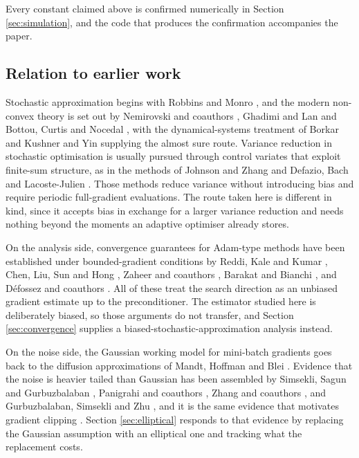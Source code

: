 \documentclass[pdflatex,sn-mathphys-num]{sn-jnl}%
\theoremstyle{thmstyleone}%
\theoremstyle{thmstyletwo}%
\theoremstyle{thmstylethree}%
\begin{document}
Every constant claimed above is confirmed numerically in Section \ref{sec:simulation}, and the code that produces the confirmation accompanies the paper.

\subsection{Relation to earlier work}

Stochastic approximation begins with Robbins and Monro \cite{robbins1951}, and the modern non-convex theory is set out by Nemirovski and coauthors \cite{nemirovski2009}, Ghadimi and Lan \cite{ghadimi2013} and Bottou, Curtis and Nocedal \cite{bottou2018}, with the dynamical-systems treatment of Borkar \cite{borkar2008} and Kushner and Yin \cite{kushner2003} supplying the almost sure route. Variance reduction in stochastic optimisation is usually pursued through control variates that exploit finite-sum structure, as in the methods of Johnson and Zhang \cite{johnson2013} and Defazio, Bach and Lacoste-Julien \cite{defazio2014}. Those methods reduce variance without introducing bias and require periodic full-gradient evaluations. The route taken here is different in kind, since it accepts bias in exchange for a larger variance reduction and needs nothing beyond the moments an adaptive optimiser already stores.

On the analysis side, convergence guarantees for Adam-type methods have been established under bounded-gradient conditions by Reddi, Kale and Kumar \cite{reddi2018}, Chen, Liu, Sun and Hong \cite{chen2019}, Zaheer and coauthors \cite{zaheer2018}, Barakat and Bianchi \cite{barakat2021}, and D\'efossez and coauthors \cite{defossez2022}. All of these treat the search direction as an unbiased gradient estimate up to the preconditioner. The estimator studied here is deliberately biased, so those arguments do not transfer, and Section \ref{sec:convergence} supplies a biased-stochastic-approximation analysis instead.

On the noise side, the Gaussian working model for mini-batch gradients goes back to the diffusion approximations of Mandt, Hoffman and Blei \cite{mandt2017}. Evidence that the noise is heavier tailed than Gaussian has been assembled by Simsekli, Sagun and Gurbuzbalaban \cite{simsekli2019}, Panigrahi and coauthors \cite{panigrahi2019}, Zhang and coauthors \cite{zhang2020attention}, and Gurbuzbalaban, Simsekli and Zhu \cite{gurbuzbalaban2021}, and it is the same evidence that motivates gradient clipping \cite{zhang2020clipping}. Section \ref{sec:elliptical} responds to that evidence by replacing the Gaussian assumption with an elliptical one and tracking what the replacement costs.
\end{document}
